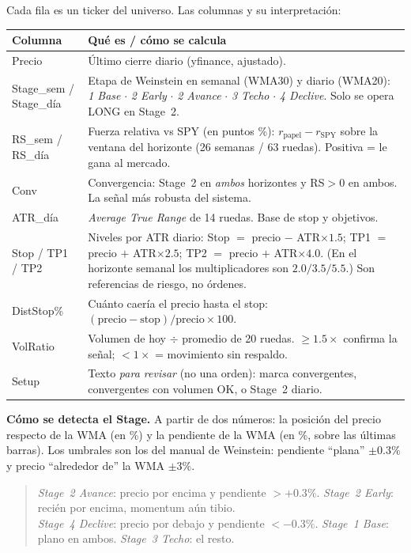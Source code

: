\documentclass[11pt,a4paper]{article}
\begin{document}
Cada fila es un ticker del universo. Las columnas y su interpretaci\'on:

\begin{longtable}{L{3.0cm} L{11.3cm}}
\toprule
\textbf{Columna} & \textbf{Qu\'e es / c\'omo se calcula} \\
\midrule
\endhead
Precio & \'Ultimo cierre diario (yfinance, ajustado). \\
\addlinespace
Stage\_sem / Stage\_d\'ia & Etapa de Weinstein en semanal (WMA30) y diario (WMA20):
\emph{1 Base} $\cdot$ \emph{2 Early} $\cdot$ \emph{2 Avance} $\cdot$ \emph{3 Techo}
$\cdot$ \emph{4 Declive}. Solo se opera LONG en Stage~2. \\
\addlinespace
RS\_sem / RS\_d\'ia & Fuerza relativa vs SPY (en puntos \%): $r_{\text{papel}} -
r_{\text{SPY}}$ sobre la ventana del horizonte (26 semanas / 63 ruedas). Positiva =
le gana al mercado. \\
\addlinespace
Conv \raisebox{-0.2ex}{$\star$} & Convergencia: Stage~2 en \emph{ambos} horizontes y
RS$>$0 en ambos. La se\~nal m\'as robusta del sistema. \\
\addlinespace
ATR\_d\'ia & \emph{Average True Range} de 14 ruedas. Base de stop y objetivos. \\
\addlinespace
Stop / TP1 / TP2 & Niveles por ATR diario: Stop $=$ precio $-$ ATR$\times1.5$; TP1 $=$
precio $+$ ATR$\times2.5$; TP2 $=$ precio $+$ ATR$\times4.0$. (En el horizonte semanal
los multiplicadores son $2.0 / 3.5 / 5.5$.) Son referencias de riesgo, no \'ordenes. \\
\addlinespace
DistStop\% & Cu\'anto caer\'ia el precio hasta el stop: $(\text{precio}-\text{stop}) /
\text{precio}\times100$. \\
\addlinespace
VolRatio & Volumen de hoy $\div$ promedio de 20 ruedas. $\ge 1.5\times$ confirma la
se\~nal; $<1\times$ = movimiento sin respaldo. \\
\addlinespace
Setup & Texto \emph{para revisar} (no una orden): marca convergentes, convergentes con
volumen OK, o Stage~2 diario. \\
\bottomrule
\end{longtable}

\noindent\textbf{C\'omo se detecta el Stage.} A partir de dos n\'umeros: la posici\'on
del precio respecto de la WMA (en \%) y la pendiente de la WMA (en \%, sobre las
\'ultimas barras). Los umbrales son los del manual de Weinstein: pendiente ``plana''
$\pm0.3\%$ y precio ``alrededor de'' la WMA $\pm3\%$.

\begin{quote}
\emph{Stage~2 Avance}: precio por encima y pendiente $>+0.3\%$.\quad
\emph{Stage~2 Early}: reci\'en por encima, momentum a\'un tibio.\\
\emph{Stage~4 Declive}: precio por debajo y pendiente $<-0.3\%$.\quad
\emph{Stage~1 Base}: plano en ambos.\quad
\emph{Stage~3 Techo}: el resto.
\end{quote}
\end{document}
